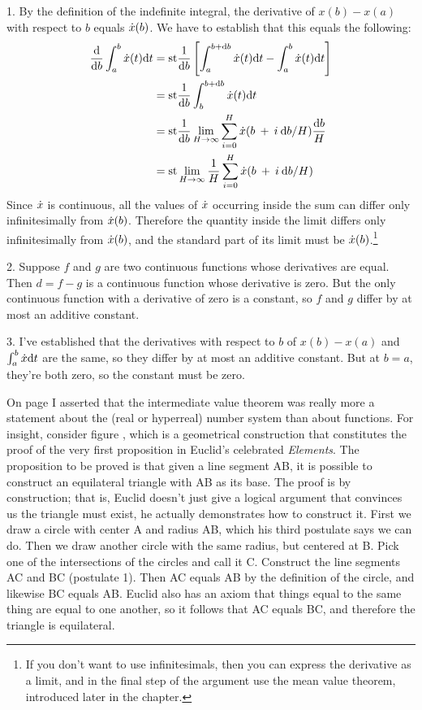 1. By the definition of the indefinite integral, the derivative of $x(b)-x(a)$ with respect to $b$ equals
$\dot{x}(b)$. We have to establish that this equals the following:
\begin{align*}
  \frac{\textup{d}}{\textup{d} b} \int_a^b \dot{x}(t) \textup{d} t 
    &= \text{st} \frac{1}{\textup{d} b}\left[\int_a^{b+\textup{d} b}  \dot{x}(t) \textup{d} t - \int_a^b  \dot{x}(t) \textup{d} t\right] \\
    &= \text{st} \frac{1}{\textup{d} b}\int_b^{b+\textup{d} b}  \dot{x}(t) \textup{d} t \\
    &= \text{st} \frac{1}{\textup{d} b}\lim_{H\rightarrow\infty} \sum_{i=0}^H  \dot{x}(b\:+\:i\:\textup{d} b/H) \frac{\textup{d} b}{H} \\
    &= \text{st} \lim_{H\rightarrow\infty} \frac{1}{H} \sum_{i=0}^H  \dot{x}(b\:+\:i\:\textup{d} b/H)
\end{align*}
Since $\dot{x}$ is continuous, all the values of $\dot{x}$ occurring inside the sum can differ
only infinitesimally from $\dot{x}(b)$. Therefore the quantity inside the limit differs only infinitesimally from
$\dot{x}(b)$, and the standard part of its limit must be $\dot{x}(b)$.\footnote{If you don't want to use infinitesimals,
then you can express the derivative as a limit, and in the final step of the argument use the mean value theorem,
introduced later in the chapter.}

2. Suppose $f$ and $g$ are two continuous functions whose derivatives are equal. Then $d=f-g$ is a continuous function whose derivative is zero.
But the only continuous function with a derivative of zero is a constant, so $f$ and $g$ differ by at most an additive constant.

3. I've established that the derivatives with respect to $b$ of $x(b)-x(a)$ and $\int_a^b \dot{x} \textup{d} t$ are the same, so they differ by
at most an additive constant. But at $b=a$, they're both zero, so the constant must be zero.

\pagebreak


On page \pageref{intermediate-value-ref-to-detour} I asserted that the intermediate value theorem was
really more a statement about the (real or hyperreal) number system than about functions. For insight,
consider figure , which is a geometrical construction that constitutes the proof of the
very first proposition in Euclid's celebrated \emph{Elements}. The proposition to be proved is that given
a line segment AB, it is possible to construct an equilateral triangle with AB as its base. The proof is
by construction; that is, Euclid doesn't just give a logical argument that convinces us the triangle must
exist, he actually demonstrates how to construct it. First we draw a circle with center
A and radius AB, which his third postulate says we can do. Then we draw another circle with the same radius,
but centered at B. Pick one of the intersections of the circles and call it C. Construct the line segments
AC and BC (postulate 1). Then AC equals AB by the definition of the
circle, and likewise BC equals AB. Euclid also has an axiom that things equal
to the same thing are equal to one another, so it follows that AC equals BC, and therefore the triangle is equilateral.

